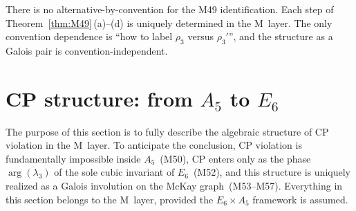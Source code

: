 \documentclass[sn-mathphys-num,Numbered]{sn-jnl}
\theoremstyle{thmstyleone}
\theoremstyle{thmstylethree}
\begin{document}
There is no alternative-by-convention for the M49 identification.  Each step
of Theorem~\ref{thm:M49}\,(a)--(d) is uniquely determined in the M~layer.
The only convention dependence is ``how to label $\rho_3$ versus $\rho_3'$'',
and the structure as a Galois pair is convention-independent.


\section{CP structure: from $A_5$ to $E_6$}\label{sec:CP}

The purpose of this section is to fully describe the algebraic structure of CP
violation in the M~layer.  To anticipate the conclusion, CP violation is
fundamentally impossible inside $A_5$~(M50), CP enters only as the phase
$\arg(\lambda_3)$ of the sole cubic invariant of $E_6$~(M52), and this
structure is uniquely realized as a Galois involution on the McKay
graph~(M53--M57).  Everything in this section belongs to the M~layer, provided
the $E_6 \times A_5$ framework is assumed.
\end{document}
